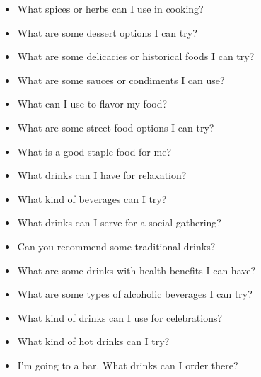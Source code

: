 \begin{itemize}
\begin{itemize}
    \item What spices or herbs can I use in cooking?
    \item What are some dessert options I can try?
    \item What are some delicacies or historical foods I can try?
    \item What are some sauces or condiments I can use?
    \item What can I use to flavor my food?
    \item What are some street food options I can try?
    \item What is a good staple food for me?
    \item What drinks can I have for relaxation?
    \item What kind of beverages can I try?
    \item What drinks can I serve for a social gathering?
    \item Can you recommend some traditional drinks?
    \item What are some drinks with health benefits I can have?
    \item What are some types of alcoholic beverages I can try?
    \item What kind of drinks can I use for celebrations?
    \item What kind of hot drinks can I try?
    \item I'm going to a bar. What drinks can I order there?
  \end{itemize}


\end{itemize}
